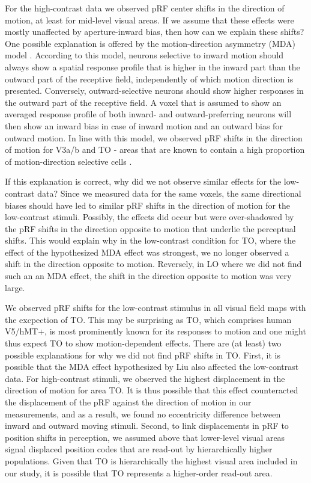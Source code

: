 For the high-contrast data we observed pRF center shifts in the direction of motion, at least for mid-level visual areas. If we assume that these effects were mostly unaffected by aperture-inward bias, then how can we explain these shifts? One possible explanation is offered by the motion-direction asymmetry (MDA) model \parencite{Liu2006}. According to this model, neurons selective to inward motion should always show a spatial response profile that is higher in the inward part than the outward part of the receptive field, independently of which motion direction is presented. Conversely, outward-selective neurons should show higher responses in the outward part of the receptive field. A voxel that is assumed to show an averaged response profile of both inward- and outward-preferring neurons will then show an inward bias in case of inward motion and an outward bias for outward motion. In line with this model, we observed pRF shifts in the direction of motion for V3a/b and TO - areas that are known to contain a high proportion of motion-direction selective cells \parencite{Dubner1971, Born2005}.

If this explanation is correct, why did we not observe similar effects for the low-contrast data? Since we measured data for the same voxels, the same directional biases should have led to similar pRF shifts in the direction of motion for the low-contrast stimuli. Possibly, the effects did occur but were over-shadowed by the pRF shifts in the direction opposite to motion that underlie the perceptual shifts. This would explain why in the low-contrast condition for TO, where the effect of the hypothesized MDA effect was strongest, we no longer observed a shift in the direction opposite to motion. Reversely, in LO where we did not find such an an MDA effect, the shift in the direction opposite to motion was very large.

We observed pRF shifts for the low-contrast stimulus in all visual field maps with the excpection of TO. This may be surprising as TO, which comprises human V5/hMT+, is most prominently known for its responses to motion and one might thus expect TO to show motion-dependent effects. There are (at least) two possible explanations for why we did not find pRF shifts in TO. First, it is possible that the MDA effect hypothesized by Liu \parencite*{Liu2006} also affected the low-contrast data. For high-contrast stimuli, we observed the highest displacement in the direction of motion for area TO. It is thus possible that this effect counteracted the displacement of the pRF against the direction of motion in our measurements, and as a result, we found no eccentricity difference between inward and outward moving stimuli. Second, to link displacements in pRF to position shifts in perception, we assumed above that lower-level visual areas signal displaced position codes that are read-out by hierarchically higher populations. Given that TO is hierarchically the highest visual area included in our study, it is possible that TO represents a higher-order read-out area.

